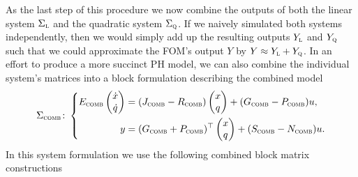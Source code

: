 As the last step of this procedure we now combine the outputs of both the linear system $\Sigma_{\textnormal{\scshape l}}$ and the quadratic system $\Sigma_{\textnormal{\scshape q}}$.
If we naively simulated both systems independently, then we would simply add up the resulting outputs $Y_{\textnormal{\scshape l}}$ and $Y_{\textnormal{\scshape q}}$ such that we could approximate the \ac{FOM}'s output $Y$ by $Y \approx Y_{\textnormal{\scshape l}} + Y_{\textnormal{\scshape q}}$.
In an effort to produce a more succinct \ac{PH} model, we can also combine the individual system's matrices into a block formulation describing the combined model
\begin{equation}\label{eq:quad-state-system-coupling}
    \Sigma_{\textnormal{\scshape comb}} \colon \left\lbrace
    \begin{aligned}
        E_{\textnormal{\scshape comb}} \begin{pmatrix}
            \dot{x} \\
            \dot{q}
        \end{pmatrix} &= (J_{\textnormal{\scshape comb}} - R_{\textnormal{\scshape comb}}) \begin{pmatrix}
            x \\
            q
        \end{pmatrix} + (G_{\textnormal{\scshape comb}} - P_{\textnormal{\scshape comb}}) u, \\
        y &= (G_{\textnormal{\scshape comb}} + P_{\textnormal{\scshape comb}})^{\top} \begin{pmatrix}
            x \\
            q
        \end{pmatrix} + (S_{\textnormal{\scshape comb}} - N_{\textnormal{\scshape comb}}) u.
    \end{aligned}
    \right.
\end{equation}
In this system formulation we use the following combined block matrix constructions
